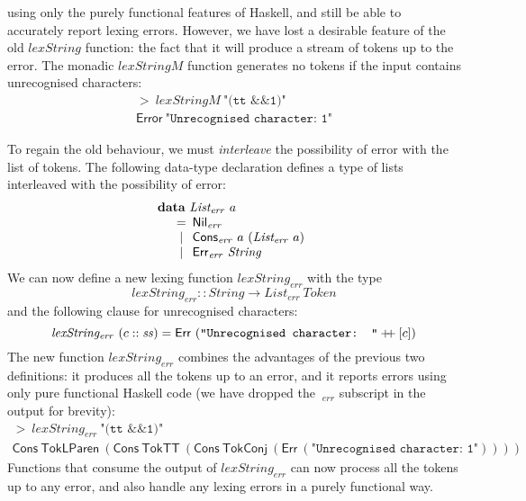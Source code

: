 \documentclass{jfp1}
\newcommand{\kw}[1]{\textbf{#1}}
\begin{document}
using only the purely functional features of Haskell, and still be
able to accurately report lexing errors. However, we have lost a
desirable feature of the old $\mathit{lexString}$ function: the fact
that it will produce a stream of tokens up to the error. The monadic
$\mathit{lexStringM}$ function generates no tokens if the input
contains unrecognised characters:
\begin{displaymath}
  \begin{array}{l}
    >~\mathit{lexStringM}~\texttt{"(tt \&\& 1)"} \\
    \mathsf{Error}~\texttt{"Unrecognised character: 1"}
  \end{array}
\end{displaymath}

To regain the old behaviour, we must \emph{interleave} the possibility
of error with the list of tokens. The following data-type declaration
defines a type of lists interleaved with the possibility of error:
\begin{displaymath}
  \begin{array}{l}
    \kw{data}~\mathit{List_{err}}~a \\
    \quad
    \begin{array}{c@{\hspace{0.5em}}l}
      = & \mathsf{Nil}_{\mathit{err}} \\
      | & \mathsf{Cons}_{\mathit{err}}~a~(\mathit{List_{err}}~a) \\
      | & \mathsf{Err}_{\mathit{err}}~\mathit{String}
    \end{array}
  \end{array}
\end{displaymath}
We can now define a new lexing function $\mathit{lexString_{err}}$ with the type
\begin{displaymath}
  \mathit{lexString_{err}} :: \mathit{String} \to \mathit{List_{err}}~\mathit{Token}
\end{displaymath}
and the following clause for unrecognised characters:
\begin{displaymath}
  \mathit{lexString_{err}}~(c :: \mathit{ss}) = \mathsf{Err}~(\texttt{"Unrecognised character: "} \mathbin{+\!\!+} [c])
\end{displaymath}
The new function $\mathit{lexString_{err}}$ combines the advantages of
the previous two definitions: it produces all the tokens up to an
error, and it reports errors using only pure functional Haskell code
(we have dropped the $\ _{err}$ subscript in the output for brevity):
\begin{displaymath}
  \begin{array}{l}
    >~\mathit{lexString_{err}}~\texttt{"(tt \&\& 1)"} \\
    \mathsf{Cons}~\mathsf{TokLParen}~(\mathsf{Cons}~\mathsf{TokTT}~(\mathsf{Cons}~\mathsf{TokConj}~(\mathsf{Err}~(\texttt{"Unrecognised character: 1"}))))
  \end{array}
\end{displaymath}
Functions that consume the output of $\mathit{lexString_{err}}$ can
now process all the tokens up to any error, and also handle any lexing
errors in a purely functional way.
\end{document}
